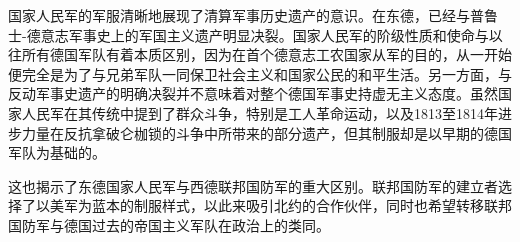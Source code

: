 国家人民军的军服清晰地展现了清算军事历史遗产的意识。在东德，已经与普鲁士-德意志军事史上的军国主义遗产明显决裂。国家人民军的阶级性质和使命与以往所有德国军队有着本质区别，因为在首个德意志工农国家从军的目的，从一开始便完全是为了与兄弟军队一同保卫社会主义和国家公民的和平生活。另一方面，与反动军事史遗产的明确决裂并不意味着对整个德国军事史持虚无主义态度。虽然国家人民军在其传统中提到了群众斗争，特别是工人革命运动，以及1813至1814年进步力量在反抗拿破仑枷锁的斗争中所带来的部分遗产，但其制服却是以早期的德国军队为基础的。

这也揭示了东德国家人民军与西德联邦国防军的重大区别。联邦国防军的建立者选择了以美军为蓝本的制服样式，以此来吸引北约的合作伙伴，同时也希望转移联邦国防军与德国过去的帝国主义军队在政治上的类同。

